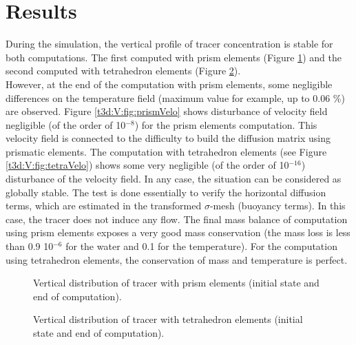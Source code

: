 \section{Results}
\bigskip
During the simulation, the vertical profile of tracer concentration is stable 
for both computations. The first computed with prism elements (Figure \ref{t3d:V:fig:prismTr})
 and the second computed with tetrahedron elements (Figure \ref{t3d:V:fig:tetraTr}).\\
However, at the end of the computation with prism elements, some negligible differences 
on the temperature field (maximum value for example, up to 0.06 \%) are observed. %
Figure \ref{t3d:V:fig:prismVelo} shows disturbance of velocity field negligible 
(of the order of 10$^{-8}$) for the prism elements computation. This velocity field is connected 
to the difficulty to build the diffusion matrix using prismatic elements. %
The computation with tetrahedron elements (see Figure \ref{t3d:V:fig:tetraVelo}) shows 
some very negligible (of the order of 10$^{-16}$) disturbance of the velocity field. %
In any case, the situation can be considered as globally stable. The test is done essentially 
to verify the horizontal diffusion terms, which are estimated in the transformed $\sigma$-mesh 
(buoyancy terms). In this case, the tracer does not induce any flow. 
The final mass balance of computation using prism elements exposes a very good mass conservation 
(the mass loss is less than 0.9 10$^{-6}$ for the water and 0.1 for the temperature). %
For the computation using tetrahedron elements, the conservation of mass and temperature is perfect.

\begin{figure}[!htbp]
\begin{minipage}[t]{0.50\textwidth}
 \centering
{}
\end{minipage}
\begin{minipage}[t]{0.50\textwidth}
 \centering
{}
\end{minipage}
 \caption{Vertical distribution of tracer with prism elements (initial state and end of computation).}
 \label{t3d:V:fig:prismTr}
\end{figure}

\begin{figure}[!htbp]
\begin{minipage}[t]{0.50\textwidth}
 \centering
{}
\end{minipage}
\begin{minipage}[t]{0.50\textwidth}
 \centering
{}
\end{minipage}
 \caption{Vertical distribution of tracer with tetrahedron elements (initial state and end of computation).}
 \label{t3d:V:fig:tetraTr}
\end{figure}


